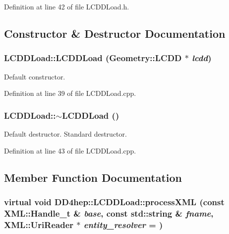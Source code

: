 Definition at line 42 of file LCDDLoad.h.

\subsection{Constructor \& Destructor Documentation}
\hypertarget{class_d_d4hep_1_1_l_c_d_d_load_a684443cb47baee03eb18960afe55458a}{
\subsubsection[{LCDDLoad}]{\setlength{\rightskip}{0pt plus 5cm}LCDDLoad::LCDDLoad ({\bf Geometry::LCDD} $\ast$ {\em lcdd})}}
\label{class_d_d4hep_1_1_l_c_d_d_load_a684443cb47baee03eb18960afe55458a}


Default constructor. 

Definition at line 39 of file LCDDLoad.cpp.\hypertarget{class_d_d4hep_1_1_l_c_d_d_load_a8eef72df9f1cf96011f88c000690f326}{
\subsubsection[{$\sim$LCDDLoad}]{\setlength{\rightskip}{0pt plus 5cm}LCDDLoad::$\sim$LCDDLoad ()}}
\label{class_d_d4hep_1_1_l_c_d_d_load_a8eef72df9f1cf96011f88c000690f326}


Default destructor. Standard destructor. 

Definition at line 43 of file LCDDLoad.cpp.

\subsection{Member Function Documentation}
\hypertarget{class_d_d4hep_1_1_l_c_d_d_load_a667dcc51174452d11aa7868d768ec5d2}{
\subsubsection[{processXML}]{\setlength{\rightskip}{0pt plus 5cm}virtual void DD4hep::LCDDLoad::processXML (const {\bf XML::Handle\_\-t} \& {\em base}, \/  const std::string \& {\em fname}, \/  {\bf XML::UriReader} $\ast$ {\em entity\_\-resolver} = {})}}
\label{class_d_d4hep_1_1_l_c_d_d_load_a667dcc51174452d11aa7868d768ec5d2}


